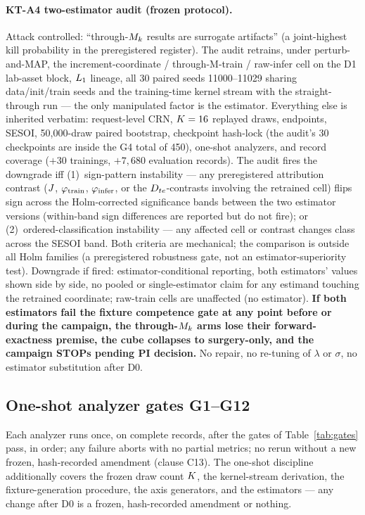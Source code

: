 \paragraph{KT-A4 two-estimator audit (frozen protocol).}
Attack controlled: ``through-$M_k$ results are surrogate artifacts'' (a
joint-highest kill probability in the preregistered register). The audit
retrains, under perturb-and-MAP, the increment-coordinate / through-M-train /
raw-infer cell on the D1 lab-asset block, $L_{1}$ lineage, all 30 paired
seeds 11000--11029 sharing data/init/train seeds and the training-time kernel
stream with the straight-through run --- the only manipulated factor is the
estimator. Everything else is inherited verbatim: request-level CRN,
$K = 16$ replayed draws, endpoints, SESOI, 50{,}000-draw paired
bootstrap, checkpoint hash-lock (the audit's 30 checkpoints are inside the G4
total of 450), one-shot analyzers, and record coverage ($+30$ trainings,
$+7{,}680$ evaluation records). The audit fires the downgrade iff
(1)~sign-pattern instability --- any preregistered attribution contrast
($J$, $\varphi_{\mathrm{train}}$, $\varphi_{\mathrm{infer}}$, or the $D_{te}$-contrasts involving
the retrained cell) flips sign across the Holm-corrected significance bands
between the two estimator versions (within-band sign differences are reported
but do not fire); or (2)~ordered-classification instability --- any affected
cell or contrast changes class across the SESOI band. Both criteria are
mechanical; the comparison is outside all Holm families (a preregistered
robustness gate, not an estimator-superiority test). Downgrade if fired:
estimator-conditional reporting, both estimators' values shown side by side,
no pooled or single-estimator claim for any estimand touching the retrained
coordinate; raw-train cells are unaffected (no estimator). \textbf{If both
estimators fail the fixture competence gate at any point before or during the
campaign, the through-$M_k$ arms lose their forward-exactness premise, the
cube collapses to surgery-only, and the campaign STOPs pending PI decision.}
No repair, no re-tuning of $\lambda$ or $\sigma$, no estimator substitution
after D0.

\subsection{One-shot analyzer gates G1--G12}
\label{sec:cube-gates}

Each analyzer runs once, on complete records, after the gates of
Table~\ref{tab:gates} pass, in order; any failure aborts with no partial
metrics; no rerun without a new frozen, hash-recorded amendment (clause C13).
The one-shot discipline additionally covers the frozen draw count $K$,
the kernel-stream derivation, the fixture-generation procedure, the axis
generators, and the estimators --- any change after D0 is a frozen,
hash-recorded amendment or nothing.

